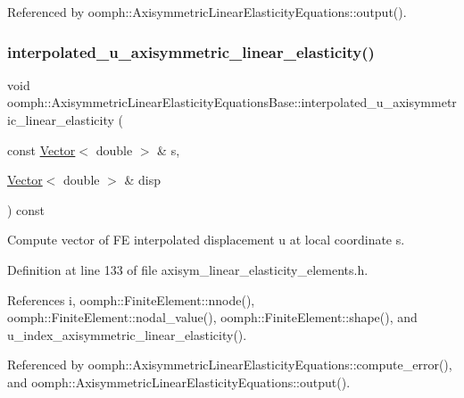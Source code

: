 Referenced by oomph\+::\+Axisymmetric\+Linear\+Elasticity\+Equations\+::output().

\mbox{\label{classoomph_1_1AxisymmetricLinearElasticityEquationsBase_afeb2209aa0968aed5fa1ac59bc942991}} 
\subsubsection{\texorpdfstring{interpolated\+\_\+u\+\_\+axisymmetric\+\_\+linear\+\_\+elasticity()}{interpolated\_u\_axisymmetric\_linear\_elasticity()}\hspace{0.1cm}{\footnotesize\ttfamily [1/2]}}
{\footnotesize\ttfamily void oomph\+::\+Axisymmetric\+Linear\+Elasticity\+Equations\+Base\+::interpolated\+\_\+u\+\_\+axisymmetric\+\_\+linear\+\_\+elasticity (\begin{DoxyParamCaption}\item[{const \hyperlink{classoomph_1_1Vector}{Vector}$<$ double $>$ \&}]{s,  }\item[{\hyperlink{classoomph_1_1Vector}{Vector}$<$ double $>$ \&}]{disp }\end{DoxyParamCaption}) const\hspace{0.3cm}{\ttfamily [inline]}}



Compute vector of FE interpolated displacement u at local coordinate s. 



Definition at line 133 of file axisym\+\_\+linear\+\_\+elasticity\+\_\+elements.\+h.



References i, oomph\+::\+Finite\+Element\+::nnode(), oomph\+::\+Finite\+Element\+::nodal\+\_\+value(), oomph\+::\+Finite\+Element\+::shape(), and u\+\_\+index\+\_\+axisymmetric\+\_\+linear\+\_\+elasticity().



Referenced by oomph\+::\+Axisymmetric\+Linear\+Elasticity\+Equations\+::compute\+\_\+error(), and oomph\+::\+Axisymmetric\+Linear\+Elasticity\+Equations\+::output().

